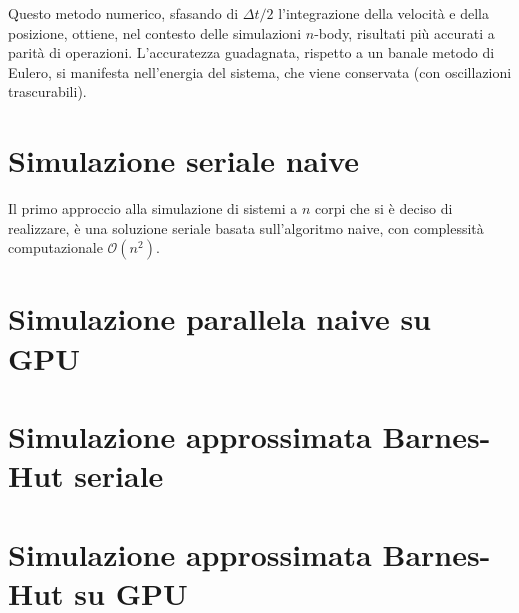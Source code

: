 \documentclass{article}
\begin{document}
	Questo metodo numerico, sfasando di $\Delta t/2$ l'integrazione della velocità e della posizione, ottiene, nel contesto delle simulazioni $n$-body, risultati più accurati a parità di operazioni. L'accuratezza guadagnata, rispetto a un banale metodo di Eulero, si manifesta nell'energia del sistema, che viene conservata (con oscillazioni trascurabili).
	
	
	\section{Simulazione seriale naive}	
	Il primo approccio alla simulazione di sistemi a $n$ corpi che si è deciso di realizzare, è una soluzione seriale basata sull'algoritmo naive, con complessità computazionale $\mathcal{O}(n^2)$.
	
	\section{Simulazione parallela naive su GPU}
	
	\section{Simulazione approssimata Barnes-Hut seriale}
	
	
	\section{Simulazione approssimata Barnes-Hut su GPU}
	
\end{document}
